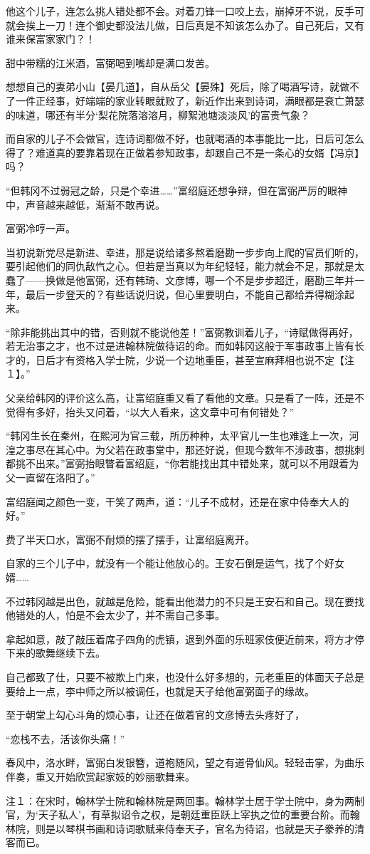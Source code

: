 他这个儿子，连怎么挑人错处都不会。对着刀锋一口咬上去，崩掉牙不说，反手可就会挨上一刀！连个御史都没法儿做，日后真是不知该怎么办了。自己死后，又有谁来保富家家门？！

甜中带糯的江米酒，富弼喝到嘴却是满口发苦。

想想自己的妻弟小山【晏几道】，自从岳父【晏殊】死后，除了喝酒写诗，就做不了一件正经事，好端端的家业转眼就败了，新近作出来到诗词，满眼都是衰亡萧瑟的味道，哪还有半分‘梨花院落溶溶月，柳絮池塘淡淡风’的富贵气象？

而自家的儿子不会做官，连诗词都做不好，也就喝酒的本事能比一比，日后可怎么得了？难道真的要靠着现在正做着参知政事，却跟自己不是一条心的女婿【冯京】吗？

“但韩冈不过弱冠之龄，只是个幸进……”富绍庭还想争辩，但在富弼严厉的眼神中，声音越来越低，渐渐不敢再说。

富弼冷哼一声。

当初说新党尽是新进、幸进，那是说给诸多熬着磨勘一步步向上爬的官员们听的，要引起他们的同仇敌忾之心。但若是当真以为年纪轻轻，能力就会不足，那就是太蠢了——换做是他富弼，还有韩琦、文彦博，哪一个不是步步超迁，磨勘三年并一年，最后一步登天的？有些话说归说，但心里要明白，不能自己都给弄得糊涂起来。

“除非能挑出其中的错，否则就不能说他差！”富弼教训着儿子，“诗赋做得再好，若无治事之才，也不过是进翰林院做待诏的命。而如韩冈这般于军事政事上皆有长才的，日后才有资格入学士院，少说一个边地重臣，甚至宣麻拜相也说不定【注１】。”

父亲给韩冈的评价这么高，让富绍庭重又看了看他的文章。只是看了一阵，还是不觉得有多好，抬头又问着，“以大人看来，这文章中可有何错处？”

“韩冈生长在秦州，在熙河为官三载，所历种种，太平官儿一生也难逢上一次，河湟之事尽在其心中。为父若在政事堂中，那还好说，但现今数年不涉政事，想挑刺都挑不出来。”富弼抬眼瞥着富绍庭，“你若能找出其中错处来，就可以不用跟着为父一直留在洛阳了。”

富绍庭闻之颜色一变，干笑了两声，道：“儿子不成材，还是在家中侍奉大人的好。”

费了半天口水，富弼不耐烦的摆了摆手，让富绍庭离开。

自家的三个儿子中，就没有一个能让他放心的。王安石倒是运气，找了个好女婿……

不过韩冈越是出色，就越是危险，能看出他潜力的不只是王安石和自己。现在要找他错处的人，怕是不会太少了，并不需自己多事。

拿起如意，敲了敲压着席子四角的虎镇，退到外面的乐班家伎便近前来，将方才停下来的歌舞继续下去。

自己都致了仕，只要不被欺上门来，也没什么好多想的，元老重臣的体面天子总是要给上一点，李中师之所以被调任，也就是天子给他富弼面子的缘故。

至于朝堂上勾心斗角的烦心事，让还在做着官的文彦博去头疼好了，

“恋栈不去，活该你头痛！”

春风中，洛水畔，富弼白发银簪，道袍随风，望之有道骨仙风。轻轻击掌，为曲乐伴奏，重又开始欣赏起家妓的妙丽歌舞来。

注１：在宋时，翰林学士院和翰林院是两回事。翰林学士居于学士院中，身为两制官，为‘天子私人’，有草拟诏令之权，是朝廷重臣跃上宰执之位的重要台阶。而翰林院，则是以琴棋书画和诗词歌赋来侍奉天子，官名为待诏，也就是天子豢养的清客而已。

